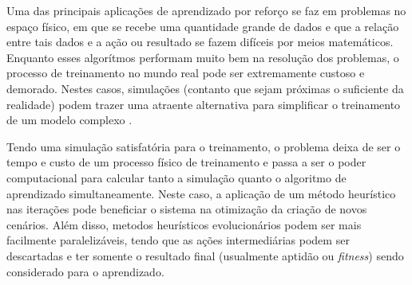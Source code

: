 Uma das principais aplica{\c c}{\~o}es de aprendizado por refor{\c c}o
se faz em problemas no espa{\c c}o f{\'i}sico, em que se recebe uma
quantidade grande de dados e que a rela{\c c}{\~a}o entre tais dados e
a a{\c c}{\~a}o ou resultado se fazem dif{\'i}ceis por meios
matem{\'a}ticos. Enquanto esses algor{\'i}tmos performam muito bem na
resolu{\c c}{\~a}o dos problemas, o processo de treinamento no mundo
real pode ser extremamente custoso e demorado. Nestes casos, simula{\c
  c}{\~o}es (contanto que sejam pr{\'o}ximas o suficiente da
realidade) podem trazer uma atraente alternativa para simplificar o
treinamento de um modelo complexo \cite{Rao_2020_CVPR}.

Tendo uma simula{\c c}{\~a}o satisfat{\'o}ria para o treinamento, o
problema deixa de ser o tempo e custo de um processo f{\'i}sico de
treinamento e passa a ser o poder computacional para calcular tanto a
simula{\c c}{\~a}o quanto o algoritmo de aprendizado simultaneamente.
Neste caso, a aplica{\c c}{\~a}o de um m{\'e}todo heur{\'i}stico nas
itera{\c c}{\~o}es pode beneficiar o sistema na otimiza{\c c}{\~a}o da
cria{\c c}{\~a}o de novos cen{\'a}rios.  Al{\'e}m disso, metodos
heur{\'i}sticos evolucion{\'a}rios podem ser mais facilmente
paraleliz{\'a}veis, tendo que as a{\c c}{\~o}es intermedi{\'a}rias
podem ser descartadas e ter somente o resultado final (usualmente
aptid{\~a}o ou \textit{fitness}) sendo considerado para o aprendizado.

